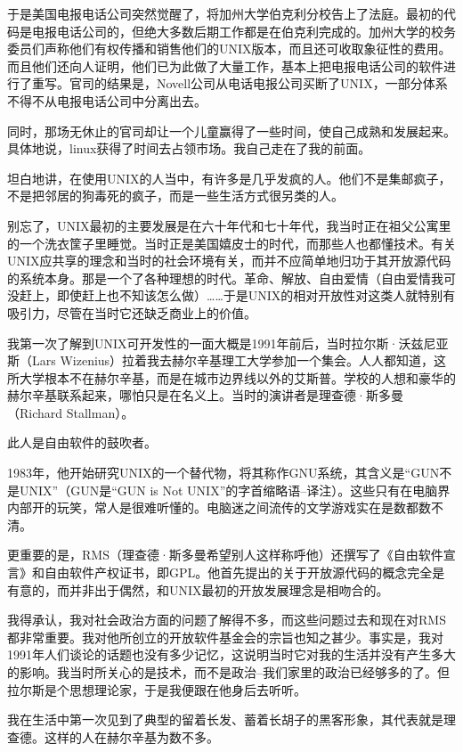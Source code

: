 于是美国电报电话公司突然觉醒了，将加州大学伯克利分校告上了法庭。最初的代码是电报电话公司的，但绝大多数后期工作都是在伯克利完成的。加州大学的校务委员们声称他们有权传播和销售他们的UNIX版本，而且还可收取象征性的费用。而且他们还向人证明，他们已为此做了大量工作，基本上把电报电话公司的软件进行了重写。官司的结果是，Novell公司从电话电报公司买断了UNIX，一部分体系不得不从电报电话公司中分离出去。

同时，那场无休止的官司却让一个儿童赢得了一些时间，使自己成熟和发展起来。具体地说，linux获得了时间去占领市场。我自己走在了我的前面。

坦白地讲，在使用UNIX的人当中，有许多是几乎发疯的人。他们不是集邮疯子，不是把邻居的狗毒死的疯子，而是一些生活方式很另类的人。

别忘了，UNIX最初的主要发展是在六十年代和七十年代，我当时正在祖父公寓里的一个洗衣筐子里睡觉。当时正是美国嬉皮士的时代，而那些人也都懂技术。有关UNIX应共享的理念和当时的社会环境有关，而并不应简单地归功于其开放源代码的系统本身。那是一个了各种理想的时代。革命、解放、自由爱情（自由爱情我可没赶上，即使赶上也不知该怎么做）……于是UNIX的相对开放性对这类人就特别有吸引力，尽管在当时它还缺乏商业上的价值。

我第一次了解到UNIX可开发性的一面大概是1991年前后，当时拉尔斯·沃兹尼亚斯（Lars Wizenius）拉着我去赫尔辛基理工大学参加一个集会。人人都知道，这所大学根本不在赫尔辛基，而是在城市边界线以外的艾斯普。学校的人想和豪华的赫尔辛基联系起来，哪怕只是在名义上。当时的演讲者是理查德·斯多曼（Richard Stallman）。

此人是自由软件的鼓吹者。

1983年，他开始研究UNIX的一个替代物，将其称作GNU系统，其含义是“GUN不是UNIX”（GUN是“GUN is Not UNIX”的字首缩略语--译注）。这些只有在电脑界内部开的玩笑，常人是很难听懂的。电脑迷之间流传的文学游戏实在是数都数不清。

更重要的是，RMS（理查德·斯多曼希望别人这样称呼他）还撰写了《自由软件宣言》和自由软件产权证书，即GPL。他首先提出的关于开放源代码的概念完全是有意的，而并非出于偶然，和UNIX最初的开放发展理念是相吻合的。

我得承认，我对社会政治方面的问题了解得不多，而这些问题过去和现在对RMS都非常重要。我对他所创立的开放软件基金会的宗旨也知之甚少。事实是，我对1991年人们谈论的话题也没有多少记忆，这说明当时它对我的生活并没有产生多大的影响。我当时所关心的是技术，而不是政治--我们家里的政治已经够多的了。但拉尔斯是个思想理论家，于是我便跟在他身后去听听。

我在生活中第一次见到了典型的留着长发、蓄着长胡子的黑客形象，其代表就是理查德。这样的人在赫尔辛基为数不多。

